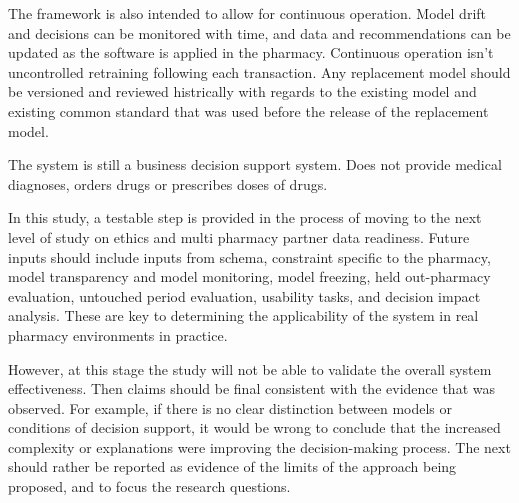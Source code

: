 \documentclass[a4paper,11pt,oneside]{book}
\makeatletter
\def\cleardoublepage{\clearpage\if@twoside \ifodd\c@page\else
\hbox{}
\thispagestyle{empty}
\newpage
\if@twocolumn\hbox{}\newpage\fi\fi\fi}
\theoremstyle{plain}
\theoremstyle{definition}
\theoremstyle{remark}
\makeatother
\begin{document}
The framework is also intended to allow for continuous operation. Model drift and decisions can be monitored with time, and data and recommendations can be updated as the software is applied in the pharmacy. Continuous operation isn't uncontrolled retraining following each transaction. Any replacement model should be versioned and reviewed histrically with regards to the existing model and existing common standard that was used before the release of the replacement model.

The system is still a business decision support system. Does not provide medical diagnoses, orders drugs or prescribes doses of drugs.

In this study, a testable step is provided in the process of moving to the next level of study  on ethics and multi pharmacy partner data readiness. Future inputs should include inputs from schema, constraint specific to the pharmacy, model transparency and model monitoring, model freezing, held out-pharmacy evaluation, untouched period evaluation, usability tasks, and decision impact analysis. These are key to determining the applicability of the system in real pharmacy environments in practice.

However, at this stage the study will not be able to validate the overall system effectiveness. Then claims should be final consistent with the evidence that was observed. For example, if there is no clear distinction between models or conditions of decision support, it would be wrong to conclude that the increased complexity or explanations were improving the decision-making process. The next should rather be reported as evidence of the limits of the approach being proposed, and to focus the research questions.


\cleardoublepage
\end{document}
